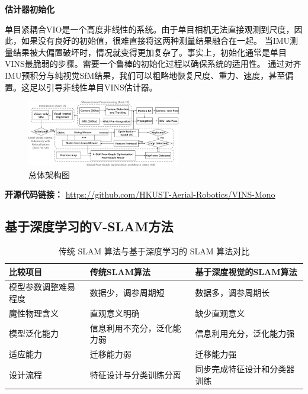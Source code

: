 \documentclass[cs4size,a4paper]{ctexart}
\numberwithin{equation}{section}
\numberwithin{table}{section}
\numberwithin{figure}{section}
\begin{document}
\textbf{估计器初始化}

单目紧耦合VIO是一个高度非线性的系统。由于单目相机无法直接观测到尺度，因此，如果没有良好的初始值，很难直接将这两种测量结果融合在一起。
当IMU测量结果被大偏置破坏时，情况就变得更加复杂了。事实上，初始化通常是单目VINS最脆弱的步骤。需要一个鲁棒的初始化过程以确保系统的适用性。
通过对齐IMU预积分与纯视觉SfM结果，我们可以粗略地恢复尺度、重力、速度，甚至偏置。这足以引导非线性单目VINS估计器。

\begin{figure}[H]
        \centering
        \includegraphics[width=0.6\textwidth]{figure/vins2.png}
        \caption{总体架构图}
\end{figure}

\textbf{开源代码链接：}
\url{https://github.com/HKUST-Aerial-Robotics/VINS-Mono}





\subsection{基于深度学习的V-SLAM方法}

\begin{table}[H]
        \centering
        \begin{tabular}{l|ll}
        \toprule
        比较项目   &传统SLAM算法 & 基于深度视觉的SLAM算法\\
        \midrule[2pt]
        模型参数调整难易程度 & 数据少，调参周期短    & 数据多，调参周期长\\
        魔性物理含义 & 直观意义明确   & 缺少直观意义\\
        模型泛化能力 & 信息利用不充分，泛化能力弱  &  信息利用充分，泛化能力强\\
        适应能力 &  迁移能力弱  & 迁移能力强\\
        设计流程 &  特征设计与分类训练分离 & 同步完成特征设计和分类器训练\\
        \bottomrule
        \end{tabular}
        \caption{传统 SLAM 算法与基于深度学习的 SLAM 算法对比\cite{ZHAOYang:889}}
\end{table}


\end{document}
